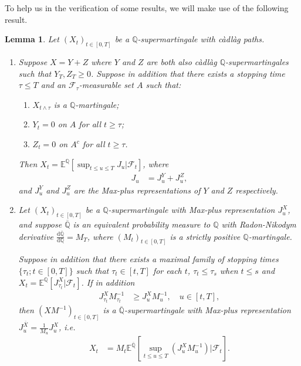 \documentclass[a4paper]{amsart}
\newtheorem{lemma}[theorem]{Lemma}
\theoremstyle{definition}
\theoremstyle{remark}
\numberwithin{equation}{section}
\newcommand{\E}{\mathbb{E}}
\newcommand{\Q}{\mathbb{Q}}
\newcommand{\di}{\mathrm{d}}
\newcommand{\Fc}{\mathcal{F}}
\newcommand{\Eq}[1]{\E^{\Q}\left[#1\right]}
\newcommand{\Ebq}[1]{\E^{\bQ}\left[#1\right]}
\newcommand{\ol}{\overline}
\newcommand{\bQ}{\ol{\mathbb{Q}}}
\begin{document}
To help us in the verification of some results, we will make use of the following result.
\begin{lemma}\label{lem:MaxPlusLemma}
  Let $(X_t)_{t\in[0,T]}$ be a $\Q$-supermartingale with c\`adl\`ag paths. %
  \begin{enumerate}
    \item Suppose $X = Y + Z$ where $Y$ and $Z$ are both also c\`adl\`ag $\Q$-supermartingales such that $Y_T, Z_T \ge 0$. Suppose in addition that there exists a stopping time $\tau \le T$ and an $\Fc_{\tau}$-measurable set $A$ such that:
    \begin{enumerate}
      \item $X_{t \wedge \tau}$ is a $\Q$-martingale;
      \item $Y_t = 0$ on $A$ for all $t \ge \tau$;
      \item $Z_t = 0$ on $A^c$ for all $t \ge \tau$. 
    \end{enumerate}
    Then $X_t = \Eq{\sup_{t \le u \le T} J_u | \Fc_t}$, where
    \begin{align*}
      J_u & = J_u^Y + J_u^Z,
    \end{align*}
    and $J_u^Y$ and $J_u^Z$ are the Max-plus representations of $Y$ and $Z$ respectively.

    \item Let $(X_t)_{t\in[0,T]}$ be a $\Q$-supermartingale with Max-plus representation $J_u^X$, and suppose $\overline{\Q}$ is an equivalent probability measure to $\Q$ with Radon-Nikodym derivative $\frac{\di \overline{\Q}}{\di \Q} = M_T$, where $(M_t)_{t\in[0,T]}$ is a strictly positive $\Q$-martingale.
    
    Suppose in addition that there exists a maximal family of stopping times $\{\tau_t; t\in[0,T]\}$ such that $\tau_t \in [t,T]$ for each $t$, $\tau_t \le \tau_s$ when $t \le s$ and $X_t = \Eq{J_{\tau_t}^X | \Fc_t}$. If in addition
    \begin{align*}
      J_{\tau_t}^X M^{-1}_{\tau_t} & \ge J_{u}^X M^{-1}_{u}, \quad u \in [t,T], 
    \end{align*}
    then $(XM^{-1})_{t\in[0,T]}$ is a $\overline{\Q}$-supermartingale with Max-plus representation $J_u^{\overline{X}} = \frac{1}{M_u} J_u^X$, i.e.
    \begin{align*}
      X_t & =  M_t \Ebq{\sup_{t \le u \le T} \left(J_u^{X} M_u^{-1}\right) | \Fc_t}.
    \end{align*}
  \end{enumerate}
\end{lemma}
\end{document}
